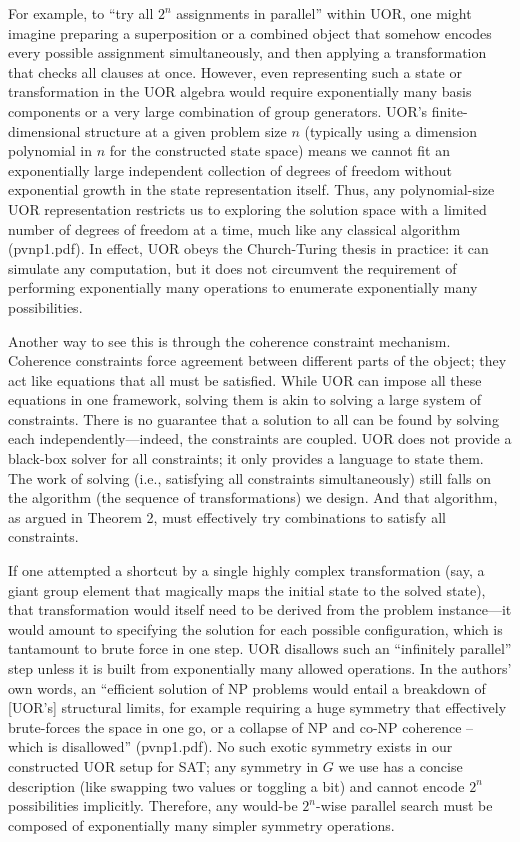 \documentclass{article}
\begin{document}
For example, to “try all $2^n$ assignments in parallel” within UOR, one might imagine preparing a superposition or a combined object that somehow encodes every possible assignment simultaneously, and then applying a transformation that checks all clauses at once. However, even representing such a state or transformation in the UOR algebra would require exponentially many basis components or a very large combination of group generators. UOR’s finite-dimensional structure at a given problem size $n$ (typically using a dimension polynomial in $n$ for the constructed state space) means we cannot fit an exponentially large independent collection of degrees of freedom without exponential growth in the state representation itself. Thus, any polynomial-size UOR representation restricts us to exploring the solution space with a limited number of degrees of freedom at a time, much like any classical algorithm (pvnp1.pdf). In effect, UOR obeys the Church-Turing thesis in practice: it can simulate any computation, but it does not circumvent the requirement of performing exponentially many operations to enumerate exponentially many possibilities.

Another way to see this is through the coherence constraint mechanism. Coherence constraints force agreement between different parts of the object; they act like equations that all must be satisfied. While UOR can impose all these equations in one framework, solving them is akin to solving a large system of constraints. There is no guarantee that a solution to all can be found by solving each independently—indeed, the constraints are coupled. UOR does not provide a black-box solver for all constraints; it only provides a language to state them. The work of solving (i.e., satisfying all constraints simultaneously) still falls on the algorithm (the sequence of transformations) we design. And that algorithm, as argued in Theorem 2, must effectively try combinations to satisfy all constraints.

If one attempted a shortcut by a single highly complex transformation (say, a giant group element that magically maps the initial state to the solved state), that transformation would itself need to be derived from the problem instance—it would amount to specifying the solution for each possible configuration, which is tantamount to brute force in one step. UOR disallows such an “infinitely parallel” step unless it is built from exponentially many allowed operations. In the authors’ own words, an “efficient solution of NP problems would entail a breakdown of [UOR’s] structural limits, for example requiring a huge symmetry that effectively brute-forces the space in one go, or a collapse of NP and co-NP coherence – which is disallowed” (pvnp1.pdf). No such exotic symmetry exists in our constructed UOR setup for SAT; any symmetry in $G$ we use has a concise description (like swapping two values or toggling a bit) and cannot encode $2^n$ possibilities implicitly. Therefore, any would-be $2^n$-wise parallel search must be composed of exponentially many simpler symmetry operations.
\end{document}
